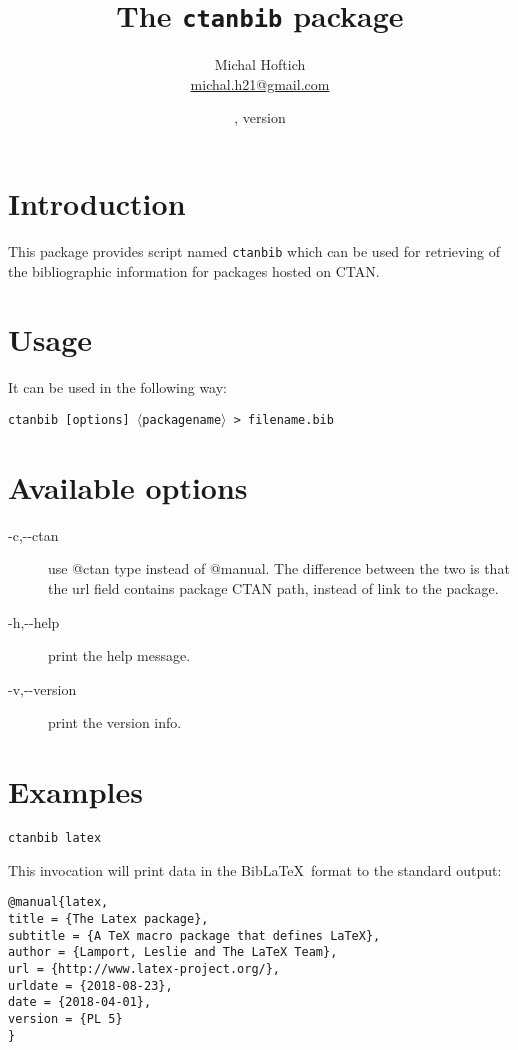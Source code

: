 \documentclass{ltxdoc}
\title{The \texttt{ctanbib} package}
\author{Michal Hoftich\\\url{michal.h21@gmail.com}}
\date{\gitdate, version \gitversion}
\newcommand\package[1]{\texttt{#1}}
\begin{document}
\maketitle

\section{Introduction}
This package provides script named \package{ctanbib} which can be used for retrieving of the bibliographic information for packages hosted on CTAN.

\section{Usage}


It can be used in the following way:


\noindent\package{ctanbib [options]  $\langle$packagename$\rangle$ > filename.bib}


\section{Available options}

\begin{description}
  \item[-c,-\/-ctan] use @ctan type instead of @manual. The difference between the two is that the url field contains package CTAN path, instead of link to the package.
  \item[-h,-\/-help] print the help message.
  \item[-v,-\/-version] print the version info.
\end{description}


\section{Examples}

\begin{verbatim}
ctanbib latex  
\end{verbatim}


\noindent This invocation will print data in the Bib\LaTeX\ format to the standard output:

\begin{verbatim}
@manual{latex,
title = {The Latex package},
subtitle = {A TeX macro package that defines LaTeX},
author = {Lamport, Leslie and The LaTeX Team},
url = {http://www.latex-project.org/},
urldate = {2018-08-23}, 
date = {2018-04-01},
version = {PL 5}
}
\end{verbatim}
\end{document}
